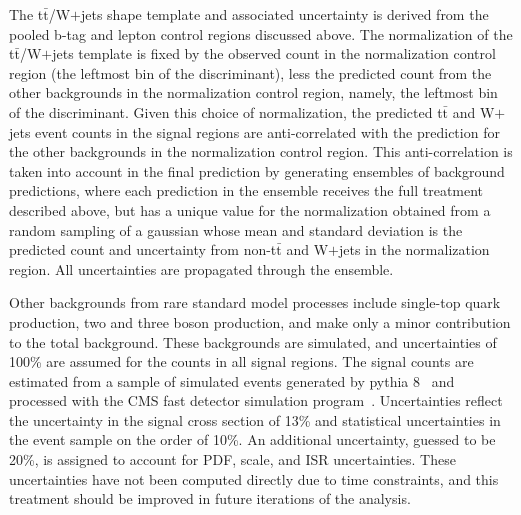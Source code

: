The t$\bar{\text{t}}$/W$+$jets shape template and associated uncertainty is derived from the pooled b-tag and lepton control regions discussed above. The normalization of the  t$\bar{\text{t}}$/W$+$jets template is fixed by the observed count in the normalization control region (the leftmost bin of the discriminant), less the predicted count from the other backgrounds in the normalization control region, namely, the leftmost bin of the discriminant. 
Given this choice of normalization, the predicted t$\bar{\text{t}}$ and W$+$jets event counts in the signal regions are anti-correlated with the prediction for the other backgrounds in the normalization control region. This anti-correlation is taken into account in the final prediction by generating ensembles of background predictions, where each prediction in the ensemble receives the full treatment described above, but has a unique value for the normalization obtained from a random sampling of a gaussian whose mean and standard deviation is the predicted count and uncertainty from non-t$\bar{\text{t}}$ and W$+$jets in the normalization region. All uncertainties are propagated through the ensemble.

Other backgrounds from rare standard model processes include single-top quark production, two and three boson production, and make only a minor contribution to the total background. These backgrounds are simulated, and uncertainties of 100\% are assumed for the counts in all signal regions. The signal counts are estimated from a sample of simulated events generated by {\sc pythia} 8~\cite{Sjostrand:2006za} and processed with the CMS fast detector simulation program~\cite{Abdullin:2011zz}. Uncertainties reflect the uncertainty in the signal cross section of 13\% and statistical uncertainties in the event sample on the order of 10\%. An additional   uncertainty, guessed to be 20\%, is assigned to account for PDF, scale, and ISR uncertainties. These uncertainties have not been computed directly due to time constraints, and this treatment should be improved in future iterations of the analysis. 

